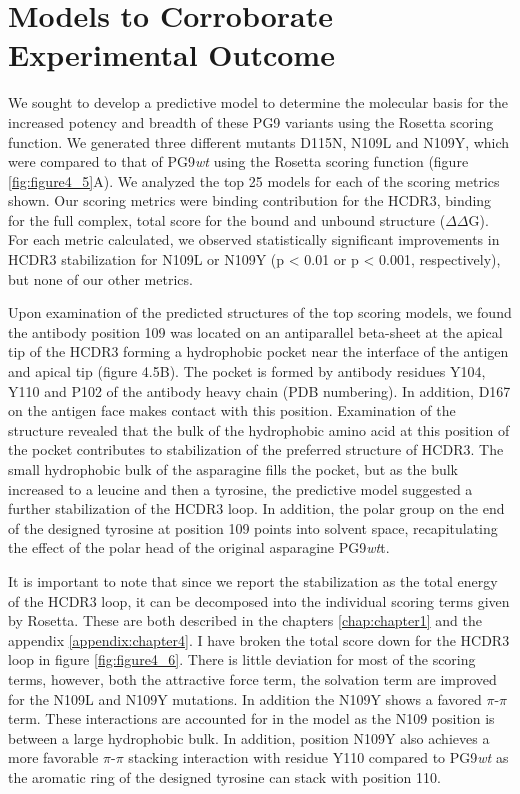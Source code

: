 \section{Models to Corroborate Experimental Outcome}
We sought to develop a predictive model to determine the molecular basis for the increased potency and breadth of these PG9 variants using the Rosetta scoring function. We generated three different mutants D115N, N109L and N109Y, which were compared to that of PG9\textit{wt} using the Rosetta scoring function (figure \ref{fig:figure4_5}A). We analyzed the top 25 models for each of the scoring metrics shown. Our scoring metrics were binding contribution for the HCDR3, binding for the full complex, total score for the bound and unbound structure ($\Delta\Delta$G). For each metric calculated, we observed statistically significant improvements in HCDR3 stabilization for N109L or N109Y (p < 0.01 or p < 0.001, respectively), but none of our other metrics. 

Upon examination of the predicted structures of the top scoring models, we found the antibody position 109 was located on an antiparallel beta-sheet at the apical tip of the HCDR3 forming a hydrophobic pocket near the interface of the antigen and apical tip (figure 4.5B). The pocket is formed by antibody residues Y104, Y110 and P102 of the antibody heavy chain (PDB numbering). In addition, D167 on the antigen face makes contact with this position. Examination of the structure revealed that the bulk of the hydrophobic amino acid at this position of the pocket contributes to stabilization of the preferred structure of HCDR3. The small hydrophobic bulk of the asparagine fills the pocket, but as the bulk increased to a leucine and then a tyrosine, the predictive model suggested a further stabilization of the HCDR3 loop. In addition, the polar group on the end of the designed tyrosine at position 109 points into solvent space, recapitulating the effect of the polar head of the original asparagine PG9\textit{wt}t. 

It is important to note that since we report the stabilization as the total energy of the HCDR3 loop, it can be decomposed into the individual scoring terms given by Rosetta. These are both described in the chapters \ref{chap:chapter1} and the appendix \ref{appendix:chapter4}. I have broken the total score down for the HCDR3 loop in figure \ref{fig:figure4_6}. There is little deviation for most of the scoring terms, however, both the attractive force term, the solvation term are improved for the N109L and N109Y mutations. In addition the N109Y shows a favored $\pi$-$\pi$ term. These interactions are accounted for in the model as the N109 position is between a large hydrophobic bulk. In addition, position N109Y also achieves a more favorable $\pi$-$\pi$ stacking interaction with residue Y110 compared to PG9\textit{wt} as the aromatic ring of the designed tyrosine can stack with position 110. 

